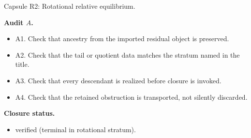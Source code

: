 \documentclass[11pt]{amsart}
\newcommand{\capsulefield}[1]{\par\smallskip\noindent\textbf{#1.}\ }
\begin{document}
\begin{proofcapsule}{Capsule R2: Rotational relative equilibrium.}
  \capsulefield{Audit \(A\)}
  \begin{itemize}[leftmargin=1.8em]
  \item A1. Check that ancestry from the imported residual object is preserved.
  \item A2. Check that the tail or quotient data matches the stratum named in the title.
  \item A3. Check that every descendant is realized before closure is invoked.
  \item A4. Check that the retained obstruction is transported, not silently discarded.
  \end{itemize}
  \capsulefield{Closure status}
  \begin{itemize}[leftmargin=1.8em]
  \item verified (terminal in rotational stratum).
  \end{itemize}
\end{proofcapsule}
\end{document}
